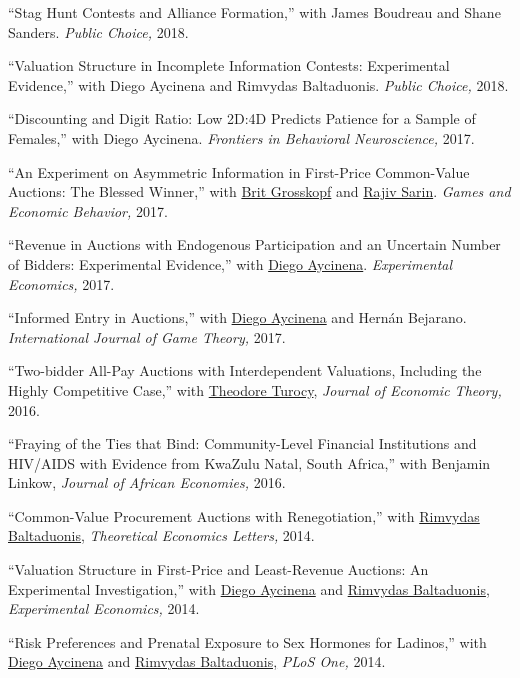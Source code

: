 \documentclass{article}%
\renewenvironment{itemize}{
\begin{list}{}{
\setlength{\leftmargin}{1.5em}
}
}{
\end{list}
}
\begin{document}
\begin{itemize}

\item ``Stag Hunt Contests and Alliance Formation,'' with James Boudreau and Shane Sanders. \textit{Public Choice,} 2018.

\item ``Valuation Structure in Incomplete Information Contests: Experimental Evidence,'' with Diego Aycinena and Rimvydas Baltaduonis. \textit{Public Choice,} 2018.

\item ``Discounting and Digit Ratio: Low 2D:4D Predicts Patience
for a Sample of Females,'' with Diego Aycinena. \emph{Frontiers in Behavioral Neuroscience,} 2017.

\item ``An Experiment on Asymmetric Information in First-Price Common-Value Auctions: The Blessed Winner,'' with
\href{http://www.bgrosskopf.com}{Brit Grosskopf} and \href{http://econweb.tamu.edu/rsarin}{Rajiv Sarin}. \emph{Games and Economic Behavior,} 2017.

\item ``Revenue in Auctions with Endogenous Participation and an Uncertain Number of Bidders: Experimental Evidence,'' with
\href{www.diegoaycinena.com}{Diego Aycinena}. \emph{Experimental Economics,} 2017.

\item ``Informed Entry in Auctions,'' with
\href{www.diegoaycinena.com}{Diego Aycinena} and Hern\'{a}n Bejarano. \emph{International Journal of Game Theory,} 2017.

\item ``Two-bidder All-Pay Auctions with Interdependent Valuations, Including the Highly Competitive Case,'' with \href{http://www.uea.ac.uk/economics/people/profile/t-turocy}{Theodore Turocy}, \emph{Journal of Economic Theory,} 2016.

\item ``Fraying of the Ties that Bind: Community-Level Financial Institutions and HIV/AIDS with Evidence from KwaZulu Natal, South Africa,'' with Benjamin Linkow, \emph{Journal of African Economies,} 2016.

\item ``Common-Value Procurement Auctions with Renegotiation,'' with \href{http://public.gettysburg.edu/~rbaltadu/}{Rimvydas Baltaduonis}, \emph{Theoretical Economics Letters,} 2014.

\item ``Valuation Structure in First-Price and Least-Revenue Auctions: An Experimental Investigation,'' with
\href{www.diegoaycinena.com}{Diego Aycinena} and \href{http://public.gettysburg.edu/~rbaltadu/}{Rimvydas Baltaduonis}, \emph{Experimental Economics,} 2014.

\item ``Risk Preferences and Prenatal Exposure to Sex Hormones for Ladinos,'' with
\href{www.diegoaycinena.com}{Diego Aycinena} and
\href{http://public.gettysburg.edu/~rbaltadu/}{Rimvydas Baltaduonis,} \emph{PLoS One,} 2014.

\end{itemize}
\end{document}
